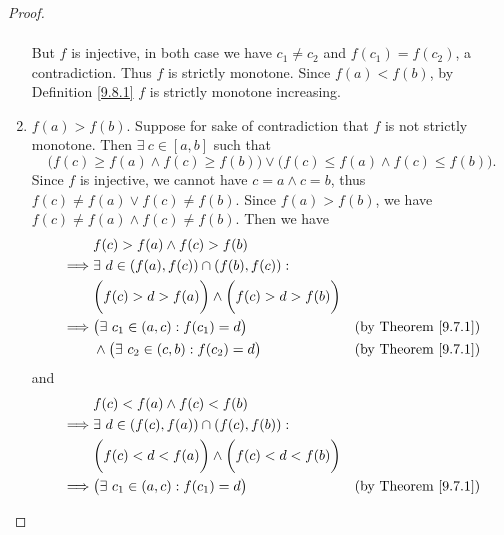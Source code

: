 \begin{proof}
\begin{enumerate}
\begin{align*}
              \end{align*}
              But \(f\) is injective, in both case we have \(c_1 \neq c_2\) and \(f(c_1) = f(c_2)\), a contradiction.
              Thus \(f\) is strictly monotone.
              Since \(f(a) < f(b)\), by Definition \ref{9.8.1} \(f\) is strictly monotone increasing.
        \item \(f(a) > f(b)\).
              Suppose for sake of contradiction that \(f\) is not strictly monotone.
              Then \(\exists\ c \in [a, b]\) such that
              \[
                  \bigg(f(c) \geq f(a) \land f(c) \geq f(b)\bigg) \lor \bigg(f(c) \leq f(a) \land f(c) \leq f(b)\bigg).
              \]
              Since \(f\) is injective, we cannot have \(c = a \land c = b\), thus \(f(c) \neq f(a) \lor f(c) \neq f(b)\).
              Since \(f(a) > f(b)\), we have \(f(c) \neq f(a) \land f(c) \neq f(b)\).
              Then we have
              \begin{align*}
                           & f(c) > f(a) \land f(c) > f(b)                                                                   \\
                  \implies & \exists\ d \in (f(a), f(c)) \cap (f(b), f(c)) :                                                 \\
                           & \bigg(f(c) > d > f(a)\bigg) \land \bigg(f(c) > d > f(b)\bigg)                                   \\
                  \implies & \big(\exists\ c_1 \in (a, c) : f(c_1) = d\big)                & \text{(by Theorem \ref{9.7.1})} \\
                           & \land \big(\exists\ c_2 \in (c, b) : f(c_2) = d\big)          & \text{(by Theorem \ref{9.7.1})} \\
              \end{align*}
              and
              \begin{align*}
                           & f(c) < f(a) \land f(c) < f(b)                                                                   \\
                  \implies & \exists\ d \in (f(c), f(a)) \cap (f(c), f(b)) :                                                 \\
                           & \bigg(f(c) < d < f(a)\bigg) \land \bigg(f(c) < d < f(b)\bigg)                                   \\
                  \implies & \big(\exists\ c_1 \in (a, c) : f(c_1) = d\big)                & \text{(by Theorem \ref{9.7.1})} \\

\end{align*}
\end{enumerate}
\end{proof}
